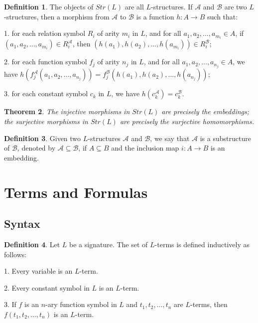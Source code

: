 \documentclass[12pt, reqno]{amsart}
\newtheorem{theorem}{Theorem}[section]
\theoremstyle{definition}
\newtheorem{definition}[theorem]{Definition}
\theoremstyle{remark}
\numberwithin{equation}{section}
\begin{document}
{\begin{definition}
    The objects of $Str(L)$ are all $L$-structures. If $\mathcal{A}$ and $\mathcal{B}$ are two $L$-structures, then a morphism from $\mathcal{A}$ to $\mathcal{B}$ is a function $h: A\to B$ such that:

    1. for each relation symbol $R_i$ of arity $m_i$ in $L$, and for all $a_1, a_2, \ldots, a_{m_i}\in A$, if $(a_1, a_2, \ldots, a_{m_i})\in R_i^{\mathcal{A}}$, then $(h(a_1), h(a_2), \ldots, h(a_{m_i}))\in R_i^{\mathcal{B}}$;

    2. for each function symbol $f_j$ of arity $n_j$ in $L$, and for all $a_1, a_2, \ldots, a_{n_j}\in A$, we have $h(f_j^{\mathcal{A}}(a_1, a_2, \ldots, a_{n_j})) = f_j^{\mathcal{B}}(h(a_1), h(a_2), \ldots, h(a_{n_j}))$;

    3. for each constant symbol $c_k$ in $L$, we have $h(c_k^{\mathcal{A}}) = c_k^{\mathcal{B}}$.
\end{definition}

\begin{theorem}
    The injective morphisms in $Str(L)$ are precisely the embeddings; the surjective morphisms in $Str(L)$ are precisely the surjective homomorphisms.
\end{theorem}

\begin{definition}
    Given two $L$-structures $\mathcal{A}$ and $\mathcal{B}$, we say that $\mathcal{A}$ is a substructure of $\mathcal{B}$, denoted by $\mathcal{A}\subseteq \mathcal{B}$, if $A\subseteq B$ and the inclusion map $i: A\to B$ is an embedding.
\end{definition}

\section{Terms and Formulas}

\subsection{Syntax}

\begin{definition}
    Let $L$ be a signature. The set of $L$-terms is defined inductively as follows:

    1. Every variable is an $L$-term.

    2. Every constant symbol in $L$ is an $L$-term.

    3. If $f$ is an $n$-ary function symbol in $L$ and $t_1, t_2, \ldots, t_n$ are $L$-terms, then $f(t_1, t_2, \ldots, t_n)$ is an $L$-term.


\end{definition}}
\end{document}
